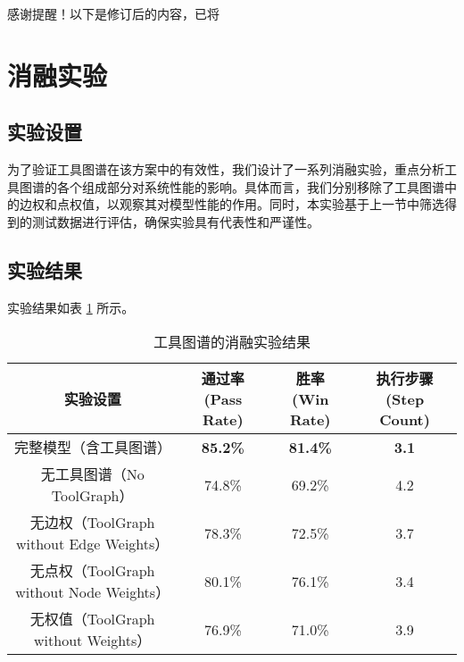 感谢提醒！以下是修订后的内容，已将 %

\section{消融实验}

\subsection{实验设置}

为了验证工具图谱在该方案中的有效性，我们设计了一系列消融实验，重点分析工具图谱的各个组成部分对系统性能的影响。具体而言，我们分别移除了工具图谱中的边权和点权值，以观察其对模型性能的作用。同时，本实验基于上一节中筛选得到的测试数据进行评估，确保实验具有代表性和严谨性。

\subsection{实验结果}

实验结果如表 \ref{tab:ablation} 所示。

\begin{table}[h]
  \centering
  \caption{工具图谱的消融实验结果}
  \label{tab:ablation}
  \begin{tabular}{|c|c|c|c|}
  \hline
  \textbf{实验设置}                      & \textbf{通过率 (Pass Rate)} & \textbf{胜率 (Win Rate)} & \textbf{执行步骤 (Step Count)} \\ \hline
  完整模型（含工具图谱）                 & \textbf{85.2\%}             & \textbf{81.4\%}          & \textbf{3.1}                   \\ \hline
  无工具图谱（No ToolGraph）             & 74.8\%                      & 69.2\%                   & 4.2                             \\ \hline
  无边权（ToolGraph without Edge Weights） & 78.3\%                      & 72.5\%                   & 3.7                             \\ \hline
  无点权（ToolGraph without Node Weights） & 80.1\%                      & 76.1\%                   & 3.4                             \\ \hline
  无权值（ToolGraph without Weights）     & 76.9\%                      & 71.0\%                   & 3.9                             \\ \hline
  \end{tabular}
  \end{table}

